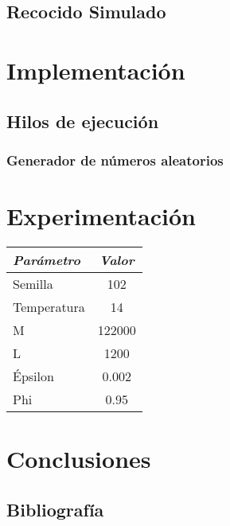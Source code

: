 \documentclass[a4paper]{report}
\begin{document}
\section{Recocido Simulado}


\chapter{Implementaci\'on}
\section{Hilos de ejecuci\'on}
\subsection{Generador de n\'umeros aleatorios}
\chapter{Experimentaci\'on}

\begin{table}[h!]
  \begin{center}
    \begin{tabular}{||l|c||}
      \hline
      \textit{Par\'ametro} & \textit{Valor}\\
      \hline
      Semilla & 102 \\
      Temperatura & 14 \\
      M & 122000 \\
      L & 1200 \\
      \'Epsilon & 0.002 \\
      Phi & 0.95 \\
      \hline
    \end{tabular}
  \end{center}
\end{table}
%   


%   

\chapter{Conclusiones}

\section{Bibliograf\'ia}
\end{document}
